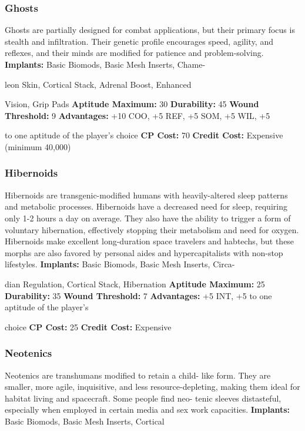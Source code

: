 \subsubsection{Ghosts}

Ghosts are partially designed for combat applications, 
but their primary focus is stealth and infiltration. 
Their genetic profile encourages speed, agility, and 
reflexes, and their minds are modified for patience and 
problem-solving.
\textbf{Implants: }Basic Biomods, Basic Mesh Inserts, Chame-

leon Skin, Cortical Stack, Adrenal Boost, Enhanced 

Vision, Grip Pads
\textbf{Aptitude Maximum: }30
\textbf{Durability:} 45
\textbf{Wound Threshold:} 9
\textbf{Advantages:} +10 COO, +5 REF, +5 SOM, +5 WIL, +5 

to one aptitude of the player's choice
\textbf{CP Cost:} 70
\textbf{Credit Cost: }Expensive (minimum 40,000)

\subsubsection{Hibernoids}

Hibernoids are transgenic-modified humans with 
heavily-altered sleep patterns and metabolic processes. 
Hibernoids have a decreased need for sleep, requiring 
only 1-2 hours a day on average. They also have the 
ability to trigger a form of voluntary hibernation, 
effectively stopping their metabolism and need for 
oxygen. Hibernoids make excellent long-duration 
space travelers and habtechs, but these morphs are 
also favored by personal aides and hypercapitalists 
with non-stop lifestyles.
\textbf{Implants: }Basic Biomods, Basic Mesh Inserts, Circa-

dian Regulation, Cortical Stack, Hibernation
\textbf{Aptitude Maximum: }25
\textbf{Durability: }35
\textbf{Wound Threshold: }7
\textbf{Advantages: }+5 INT, +5 to one aptitude of the player's 

choice
\textbf{CP Cost:} 25
\textbf{Credit Cost: }Expensive

\subsubsection{Neotenics}

Neotenics are transhumans modified to retain a child-
like form. They are smaller, more agile, inquisitive, 
and less resource-depleting, making them ideal for 
habitat living and spacecraft. Some people find neo-
tenic sleeves distasteful, especially when employed in 
certain media and sex work capacities.
\textbf{Implants: }Basic Biomods, Basic Mesh Inserts, Cortical 

